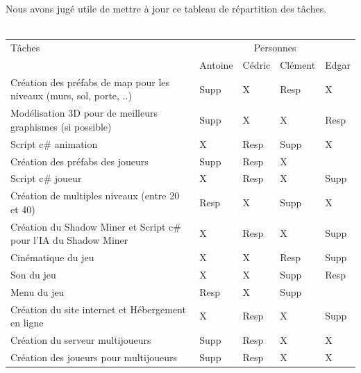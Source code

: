 \documentclass[titlepage, 13px, a4paper]{report}
\begin{document}
\paragraph{} \hspace{0pt} \\ 
Nous avons jugé utile de mettre à jour ce tableau de répartition des tâches.
\\ \\
{\normalsize
	\begin{tabular}{|p{6cm}|p{1.2cm}|p{1.2cm}|p{1.2cm}|p{1.2cm}|}
		\hline
		Tâches & \multicolumn{4}{|c|}{Personnes} \\ 
		\cline{2-5}
			& Antoine & Cédric & Clément & Edgar \\
		\hline
		Création des préfabs de map pour les niveaux (murs, sol, porte, ..) & Supp\footnotemark[2] & X & Resp\footnotemark[1] & X \\
		\hline
		Modélisation 3D pour de meilleurs graphismes (si possible) & Supp\footnotemark[2] & X & X & Resp\footnotemark[1] \\
		\hline
		Script c\# animation & X & Resp\footnotemark[1] & Supp\footnotemark[2] & X \\
		\hline
		Création des préfabs des joueurs & Supp\footnotemark[2] & Resp\footnotemark[1] & X &  \\
		\hline
		Script c\# joueur & X & Resp\footnotemark[1] & X & Supp\footnotemark[2] \\
		\hline
		Création de multiples niveaux (entre 20 et 40) & Resp\footnotemark[1] & X & Supp\footnotemark[2] & X \\
		\hline
		Création du Shadow Miner et Script c\# pour l'IA du Shadow Miner & X & Resp\footnotemark[1] & X & Supp\footnotemark[2] \\
		\hline
		Cinématique du jeu & X & X & Resp\footnotemark[1] & Supp\footnotemark[2] \\
		\hline
		Son du jeu & X & X & Supp\footnotemark[2] & Resp\footnotemark[1] \\
		\hline
		Menu du jeu & Resp\footnotemark[1] & X & Supp\footnotemark[2] & \\
		\hline
		Création du site internet et Hébergement en ligne & X & Resp\footnotemark[1] & X & Supp\footnotemark[2] \\
		\hline
		Création du serveur multijoueurs & Supp\footnotemark[2] & Resp\footnotemark[1] & X & X \\
		\hline
		Création des joueurs pour multijoueurs & Supp\footnotemark[2] & Resp\footnotemark[1] & X & X \\

\end{tabular}}
\end{document}
